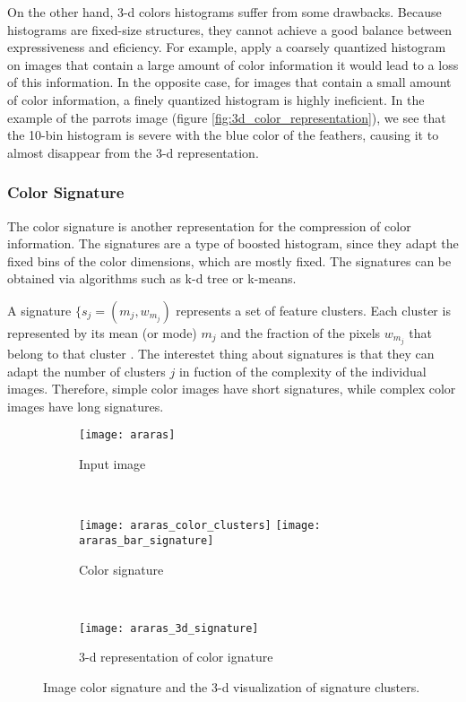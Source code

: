 On the other hand, 3-d colors histograms suffer from some drawbacks. Because histograms are fixed-size structures, they cannot achieve a good balance between expressiveness and eficiency. For example, apply a coarsely quantized histogram on images that contain a large amount of color information it would lead to a loss of this information. In the opposite case, for images that contain a small amount of color information, a finely quantized histogram is highly ineficient. In the example of the parrots image (figure \ref{fig:3d_color_representation}), we see that the 10-bin histogram is severe with the blue color of the feathers, causing it to almost disappear from the 3-d representation. 








\subsubsection{Color Signature}

The color signature is another representation for the compression of color information. The signatures are a type of boosted histogram, since they adapt the fixed bins of the color dimensions, which are mostly fixed. The signatures can be obtained via algorithms such as k-d tree or k-means. 

A signature $\{s_j = (m_j, w_{m_j})$ represents a set of feature clusters. Each cluster is represented by its mean (or mode) $m_j$ and the fraction of the pixels $w_{m_j}$ that belong to that cluster \citep{Rubner.Tomasi:Book:2001}. The interestet thing about signatures is that they can adapt the number of clusters $j$ in fuction of the complexity of the individual images. Therefore, simple color images have short signatures, while complex color images have long signatures. 


\begin{figure}[!ht]
    \centering
    \begin{subfigure}[b]{0.25\textwidth}
        \texttt{[image: araras]}
        \caption{Input image}
    \end{subfigure} \\
    
    \begin{subfigure}[b]{0.4\textwidth}
    	\texttt{[image: araras\_color\_clusters]}
        \texttt{[image: araras\_bar\_signature]}
        \caption{Color signature}
    \end{subfigure}
    	~ %
    \begin{subfigure}[b]{0.5\textwidth}
        \texttt{[image: araras\_3d\_signature]}
        \caption{3-d representation of color ignature}
    \end{subfigure} 
    	    
    \caption{Image color signature and the 3-d visualization of signature clusters.}\label{fig:color_signature}    
\end{figure}

